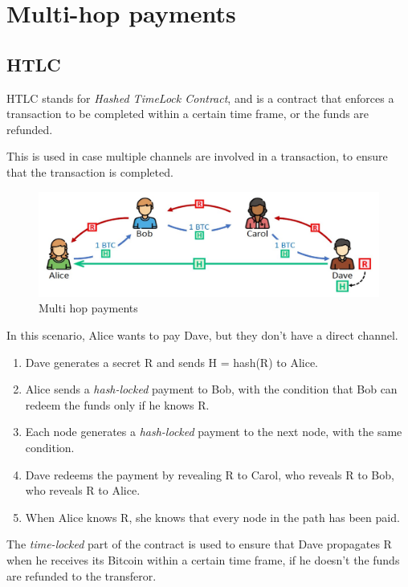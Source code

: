 \section{Multi-hop payments}
\subsection{HTLC}
HTLC stands for \textit{Hashed TimeLock Contract}, and is a contract that enforces a transaction to be completed within a certain time frame, or the funds are refunded.

This is used in case multiple channels are involved in a transaction, to ensure that the transaction is completed.

\begin{figure}[htbp]
   \centering
   \includegraphics{images/lightning_HTLC1.png}
   \caption{Multi hop payments}
   \label{fig:lightning_HTLC1}
\end{figure}

In this scenario, Alice wants to pay Dave, but they don't have a direct channel.
\begin{enumerate}
   \item Dave generates a secret R and sends H = hash(R) to Alice.
   \item Alice sends a \textit{hash-locked} payment to Bob, with the condition that Bob can redeem the funds only if he knows R.
   \item Each node generates a \textit{hash-locked} payment to the next node, with the same condition.
   \item Dave redeems the payment by revealing R to Carol, who reveals R to Bob, who reveals R to Alice.
   \item When Alice knows R, she knows that every node in the path has been paid.
\end{enumerate}

The \textit{time-locked} part of the contract is used to ensure that Dave propagates R when he receives its Bitcoin within a certain time frame, if he doesn't the funds are refunded to the transferor.

